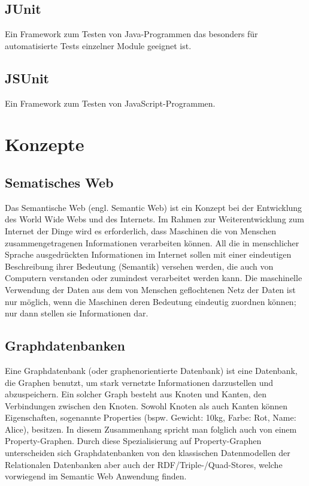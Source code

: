 \documentclass[11pt,a4paper]{article}
\begin{document}
\subsection{JUnit} Ein Framework zum Testen von Java-Programmen das besonders für automatisierte Tests einzelner Module geeignet ist.

\subsection{JSUnit} Ein Framework zum Testen von JavaScript-Programmen.


\section{Konzepte}
\subsection{Sematisches Web}
Das Semantische Web (engl. Semantic Web) ist ein Konzept bei der Entwicklung des World Wide Webs und des   Internets. Im Rahmen zur Weiterentwicklung zum Internet der Dinge wird es erforderlich, dass Maschinen die von   Menschen  zusammengetragenen Informationen verarbeiten können. All die   in  menschlicher Sprache ausgedrückten Informationen im Internet sollen   mit  einer eindeutigen Beschreibung ihrer Bedeutung (Semantik)   versehen  werden, die auch von Computern verstanden oder zumindest   verarbeitet  werden kann. Die maschinelle Verwendung der Daten aus dem   von Menschen  geflochtenen Netz der Daten ist nur möglich, wenn die   Maschinen deren  Bedeutung eindeutig zuordnen können; nur dann stellen   sie Informationen  dar.

\subsection{Graphdatenbanken}
Eine Graphdatenbank (oder graphenorientierte Datenbank) ist eine Datenbank, die Graphen benutzt, um stark vernetzte Informationen darzustellen und abzuspeichern. Ein solcher Graph besteht aus Knoten und Kanten, den Verbindungen zwischen den Knoten. Sowohl Knoten als auch Kanten können Eigenschaften, sogenannte Properties (bspw. Gewicht: 10kg, Farbe: Rot, Name: Alice), besitzen. In diesem Zusammenhang spricht man folglich auch von einem Property-Graphen. Durch diese Spezialisierung auf Property-Graphen unterscheiden sich Graphdatenbanken von den klassischen Datenmodellen der Relationalen Datenbanken aber auch der RDF/Triple-/Quad-Stores, welche vorwiegend im Semantic Web Anwendung finden.
\end{document}
